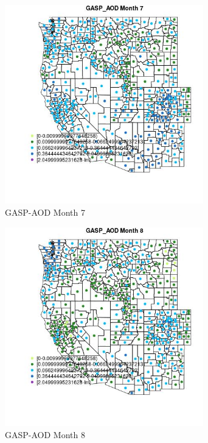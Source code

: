 \begin{figure} 
\centering  
\includegraphics[width=0.77\textwidth]{Code_Outputs/df_report_ML_predictors_CountyCentroid_Locations_Dates_2008-01-01to2018-12-31_MapObsMo7GASP_AOD.jpg} 
\caption{\label{fig:df_report_ML_predictors_CountyCentroid_Locations_Dates_2008-01-01to2018-12-31MapObsMo7GASP_AOD}GASP-AOD Month 7} 
\end{figure} 
 

\begin{figure} 
\centering  
\includegraphics[width=0.77\textwidth]{Code_Outputs/df_report_ML_predictors_CountyCentroid_Locations_Dates_2008-01-01to2018-12-31_MapObsMo8GASP_AOD.jpg} 
\caption{\label{fig:df_report_ML_predictors_CountyCentroid_Locations_Dates_2008-01-01to2018-12-31MapObsMo8GASP_AOD}GASP-AOD Month 8} 
\end{figure} 
 

